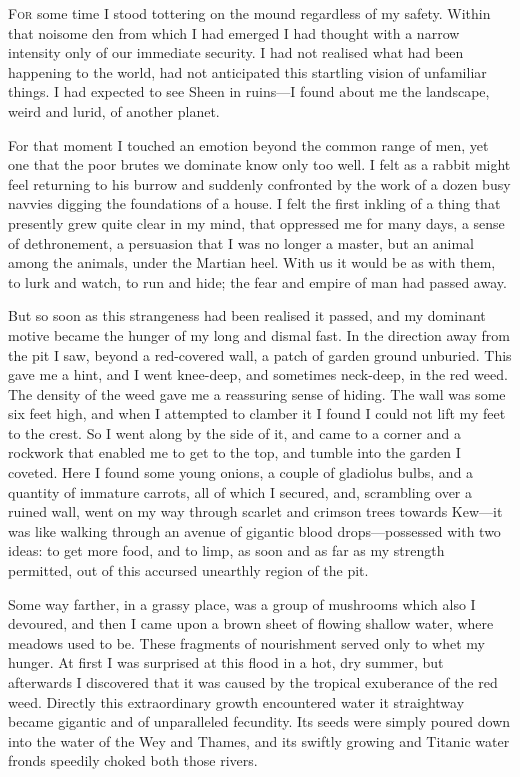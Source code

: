 

\lettrine[lines=4]{F}{or} some time I stood tottering on the mound regardless of my safety. Within that noisome den from which I had emerged I had thought with a narrow intensity only of our immediate security. I had not realised what had been happening to the world, had not anticipated this startling vision of unfamiliar things. I had expected to see Sheen in ruins—I found about me the landscape, weird and lurid, of another planet.

For that moment I touched an emotion beyond the common range of men, yet one that the poor brutes we dominate know only too well. I felt as a rabbit might feel returning to his burrow and suddenly confronted by the work of a dozen busy navvies digging the foundations of a house. I felt the first inkling of a thing that presently grew quite clear in my mind, that oppressed me for many days, a sense of dethronement, a persuasion that I was no longer a master, but an animal among the animals, under the Martian heel. With us it would be as with them, to lurk and watch, to run and hide; the fear and empire of man had passed away.

But so soon as this strangeness had been realised it passed, and my dominant motive became the hunger of my long and dismal fast. In the direction away from the pit I saw, beyond a red-covered wall, a patch of garden ground unburied. This gave me a hint, and I went knee-deep, and sometimes neck-deep, in the red weed. The density of the weed gave me a reassuring sense of hiding. The wall was some six feet high, and when I attempted to clamber it I found I could not lift my feet to the crest. So I went along by the side of it, and came to a corner and a rockwork that enabled me to get to the top, and tumble into the garden I coveted. Here I found some young onions, a couple of gladiolus bulbs, and a quantity of immature carrots, all of which I secured, and, scrambling over a ruined wall, went on my way through scarlet and crimson trees towards Kew—it was like walking through an avenue of gigantic blood drops—possessed with two ideas: to get more food, and to limp, as soon and as far as my strength permitted, out of this accursed unearthly region of the pit.

Some way farther, in a grassy place, was a group of mushrooms which also I devoured, and then I came upon a brown sheet of flowing shallow water, where meadows used to be. These fragments of nourishment served only to whet my hunger. At first I was surprised at this flood in a hot, dry summer, but afterwards I discovered that it was caused by the tropical exuberance of the red weed. Directly this extraordinary growth encountered water it straightway became gigantic and of unparalleled fecundity. Its seeds were simply poured down into the water of the Wey and Thames, and its swiftly growing and Titanic water fronds speedily choked both those rivers.

